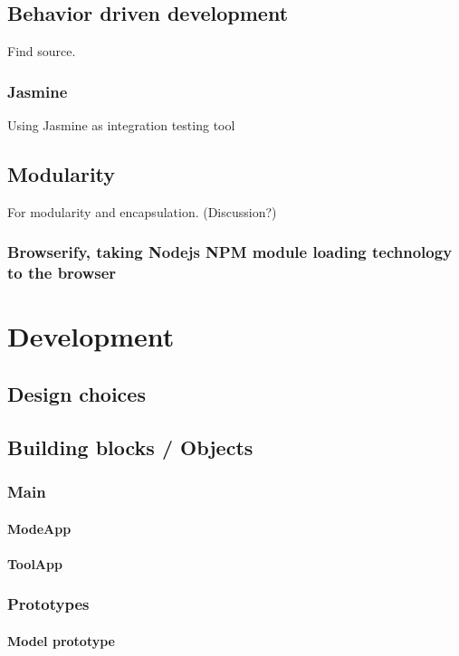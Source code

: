 \documentclass[english]{ifimaster}
\begin{document}
\section{Behavior driven development}
Find source.

\subsection{Jasmine}
Using Jasmine as integration testing tool

\section{Modularity}
For modularity and encapsulation. (Discussion?)
\subsection{Browserify, taking Nodejs NPM module loading technology to the browser}

\chapter{Development}
\section{Design choices}
\section{Building blocks / Objects}
\subsection{Main}
\subsubsection{ModeApp}
\subsubsection{ToolApp}

\subsection{Prototypes}
\subsubsection{Model prototype}
\end{document}
